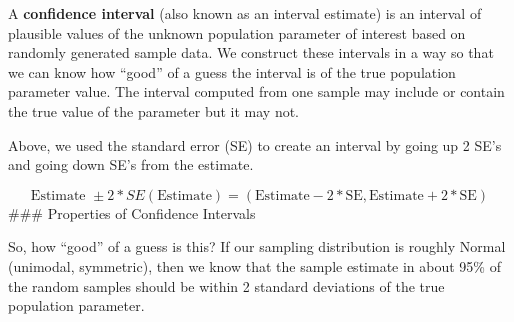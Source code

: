 \documentclass[
]{book}
\begin{document}
A \textbf{confidence interval} (also known as an interval estimate) is an interval of plausible values of the unknown population parameter of interest based on randomly generated sample data. We construct these intervals in a way so that we can know how ``good'' of a guess the interval is of the true population parameter value. The interval computed from one sample may include or contain the true value of the parameter but it may not.

Above, we used the standard error (SE) to create an interval by going up 2 SE's and going down SE's from the estimate.

\[\text{Estimate }\pm 2*SE(\text{Estimate}) = (\text{Estimate} - 2*\text{SE}, \text{Estimate} + 2*\text{SE})\]
\#\#\# Properties of Confidence Intervals

So, how ``good'' of a guess is this? If our sampling distribution is roughly Normal (unimodal, symmetric), then we know that the sample estimate in about 95\% of the random samples should be within 2 standard deviations of the true population parameter.
\end{document}
